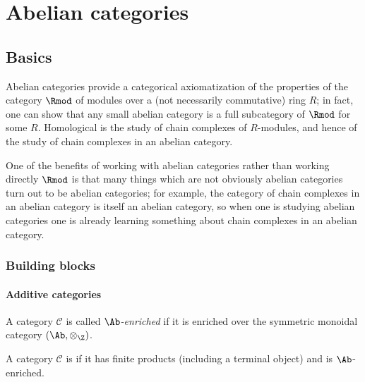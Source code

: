 \documentclass[main.tex]{subfiles}
\begin{document}
\chapter{Abelian categories}
\label{ch:abelian_categories}

\section{Basics}
\label{sec:basics}

Abelian categories provide a categorical axiomatization of the properties of the category $\Rmod$ of modules over a (not necessarily commutative) ring $R$; in fact, one can show that any small abelian category is a full subcategory of $\Rmod$ for some $R$. Homological is the study of chain complexes of $R$-modules, and hence of the study of chain complexes in an abelian category. 

One of the benefits of working with abelian categories rather than working directly $\Rmod$ is that many things which are not obviously abelian categories turn out to be abelian categories; for example, the category of chain complexes in an abelian category is itself an abelian category, so when one is studying abelian categories one is already learning something about chain complexes in an abelian category.

\subsection{Building blocks}
\label{ssc:building_blocks}

\subsubsection{Additive categories}

\begin{definition}
  \label{def:ab_enriched_category}
  A category $\mathcal{C}$ is called \emph{$\Ab$-enriched} if it is enriched over the symmetric monoidal category $(\Ab, \otimes_{\Z})$.
\end{definition}


\begin{definition}
  \label{def:additivecategory}
  A category $\mathcal{C}$ is  if it has finite products (including a terminal object) and is $\Ab$-enriched.
\end{definition}
\end{document}
